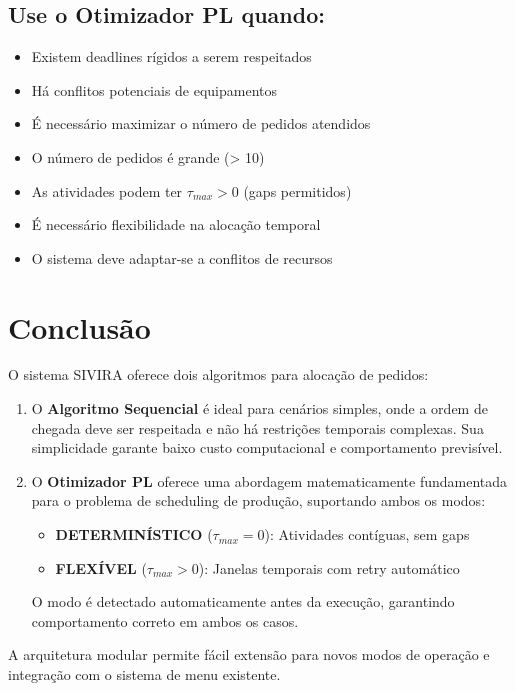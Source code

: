 \documentclass[12pt,a4paper]{article}
\begin{document}
\subsection{Use o Otimizador PL quando:}

\begin{itemize}
    \item Existem deadlines rígidos a serem respeitados
    \item Há conflitos potenciais de equipamentos
    \item É necessário maximizar o número de pedidos atendidos
    \item O número de pedidos é grande (> 10)
    \item As atividades podem ter $\tau_{max} > 0$ (gaps permitidos)
    \item É necessário flexibilidade na alocação temporal
    \item O sistema deve adaptar-se a conflitos de recursos
\end{itemize}

\section{Conclusão}

O sistema SIVIRA oferece dois algoritmos para alocação de pedidos:

\begin{enumerate}
    \item O \textbf{Algoritmo Sequencial} é ideal para cenários simples, onde a ordem de chegada deve ser respeitada e não há restrições temporais complexas. Sua simplicidade garante baixo custo computacional e comportamento previsível.

    \item O \textbf{Otimizador PL} oferece uma abordagem matematicamente fundamentada para o problema de scheduling de produção, suportando ambos os modos:
    \begin{itemize}
        \item \textbf{DETERMINÍSTICO} ($\tau_{max} = 0$): Atividades contíguas, sem gaps
        \item \textbf{FLEXÍVEL} ($\tau_{max} > 0$): Janelas temporais com retry automático
    \end{itemize}
    O modo é detectado automaticamente antes da execução, garantindo comportamento correto em ambos os casos.
\end{enumerate}

A arquitetura modular permite fácil extensão para novos modos de operação e integração com o sistema de menu existente.
\end{document}
